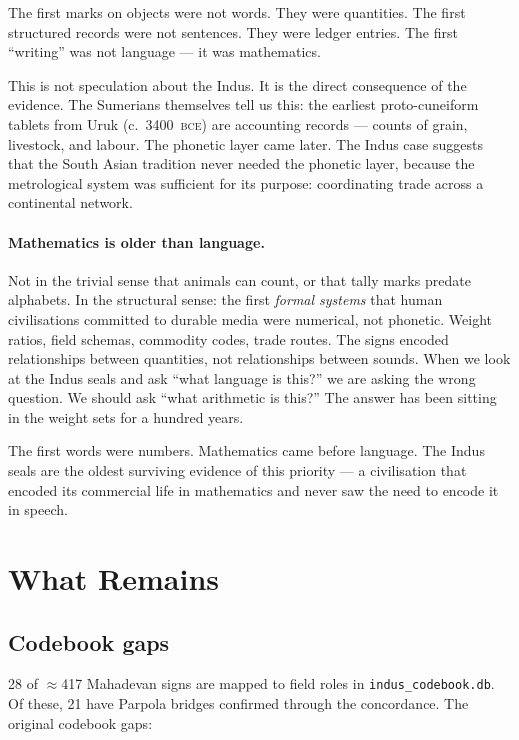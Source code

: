 The first marks on objects were not words. They were quantities.
The first structured records were not sentences. They were
ledger entries. The first ``writing'' was not language --- it was
mathematics.

This is not speculation about the Indus. It is the direct
consequence of the evidence. The Sumerians themselves tell us this:
the earliest proto-cuneiform tablets from Uruk (c.\ 3400~\textsc{bce})
are accounting records --- counts of grain, livestock, and labour.
The phonetic layer came later. The Indus case suggests that the
South Asian tradition never needed the phonetic layer, because the
metrological system was sufficient for its purpose: coordinating
trade across a continental network.

\paragraph{Mathematics is older than language.}
Not in the trivial sense that animals can count, or that tally
marks predate alphabets. In the structural sense: the first
\emph{formal systems} that human civilisations committed to
durable media were numerical, not phonetic. Weight ratios, field
schemas, commodity codes, trade routes. The signs encoded
relationships between quantities, not relationships between
sounds. When we look at the Indus seals and ask ``what language
is this?'' we are asking the wrong question. We should ask ``what
arithmetic is this?'' The answer has been sitting in the weight
sets for a hundred years.

The first words were numbers. Mathematics came before language.
The Indus seals are the oldest surviving evidence of this
priority --- a civilisation that encoded its commercial life in
mathematics and never saw the need to encode it in speech.

\section{What Remains}

\subsection{Codebook gaps}

28 of $\approx$417 Mahadevan signs are mapped to field roles in
\texttt{indus\_codebook.db}. Of these, 21 have Parpola bridges
confirmed through the concordance. The original codebook gaps:

